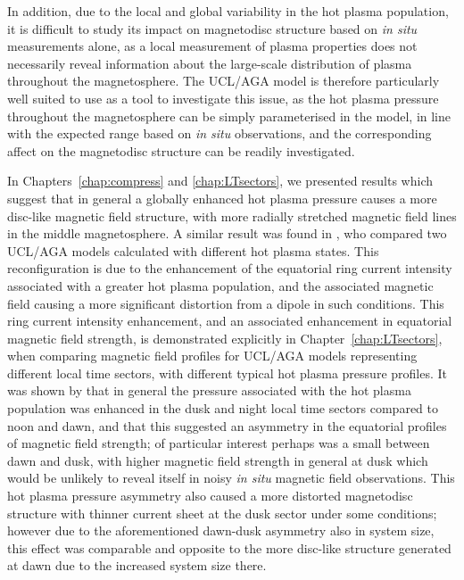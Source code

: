 In addition, due to the local and global variability in the hot plasma population, it is difficult to study its impact on magnetodisc structure based on \textit{in situ} measurements alone, as a local measurement of plasma properties does not necessarily reveal information about the large-scale distribution of plasma throughout the magnetosphere. The UCL/AGA model is therefore particularly well suited to use as a tool to investigate this issue, as the hot plasma pressure throughout the magnetosphere can be simply parameterised in the model, in line with the expected range based on \textit{in situ} observations, and the corresponding affect on the magnetodisc structure can be readily investigated. 

In Chapters~\ref{chap:compress} and \ref{chap:LTsectors}, we presented results which suggest that in general a globally enhanced hot plasma pressure causes a more disc-like magnetic field structure, with more radially stretched magnetic field lines in the middle magnetosphere. A similar result was found in \citet{achilleos2010b}, who compared two UCL/AGA models calculated with different hot plasma states. This reconfiguration is due to the enhancement of the equatorial ring current intensity associated with a greater hot plasma population, and the associated magnetic field causing a more significant distortion from a dipole in such conditions. This ring current intensity enhancement, and an associated enhancement in equatorial magnetic field strength, is demonstrated explicitly in Chapter~\ref{chap:LTsectors}, when comparing magnetic field profiles for UCL/AGA models representing different local time sectors, with different typical hot plasma pressure profiles. It was shown by \citet{sergis2017} that in general the pressure associated with the hot plasma population was enhanced in the dusk and night local time sectors compared to noon and dawn, and that this suggested an asymmetry in the equatorial profiles of magnetic field strength; of particular interest perhaps was a small between dawn and dusk, with higher magnetic field strength in general at dusk which would be unlikely to reveal itself in noisy \textit{in situ} magnetic field observations. This hot plasma pressure asymmetry also caused a more distorted magnetodisc structure with thinner current sheet at the dusk sector under some conditions; however due to the aforementioned dawn-dusk asymmetry also in system size, this effect was comparable and opposite to the more disc-like structure generated at dawn due to the increased system size there.

